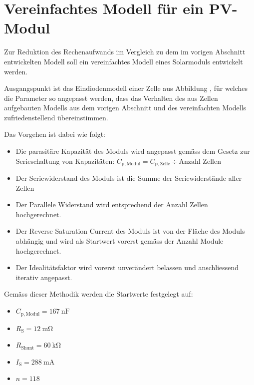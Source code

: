 \chapter{Vereinfachtes Modell f\"ur ein PV-Modul}
\label{app:models:develop:module:simple}

Zur  Reduktion des  Rechenaufwands im  Vergleich zu  dem im  vorigen Abschnitt
entwickelten Modell soll ein vereinfachtes Modell eines Solarmoduls entwickelt
werden.

Ausgangspunkt   ist   das   Eindiodenmodell    einer   Zelle   aus   Abbildung
, f\"ur  welches die Parameter  so angepasst werden,  dass das
Verhalten des aus Zellen aufgebauten Modells aus dem vorigen Abschnitt und des
vereinfachten Modells zufriedenstellend \"ubereinstimmen.

Das Vorgehen ist dabei wie folgt: 

\begin{itemize}
    \firmlist
    \item
        Die parasit\"are  Kapazit\"at des  Moduls wird angepasst  gem\"ass dem
        Gesetz zur Serieschaltung von Kapazit\"aten:
        $C_{\mathrm{p, Modul}} = C_{\mathrm{p, Zelle}} \div \text{Anzahl Zellen}$
    \item
        Der Seriewiderstand des Moduls ist die Summe der Seriewiderst\"ande aller
        Zellen
    \item
        Der  Parallele   Widerstand  wird   entsprechend  der   Anzahl  Zellen
        hochgerechnet.
    \item
        Der Reverse  Saturation Current  des Moduls ist  von der  Fl\"ache des
        Moduls abh\"angig und  wird als Startwert vorerst  gem\"ass der Anzahl
        Module hochgerechnet.
    \item
        Der  Idealit\"atsfaktor   wird  vorerst  unver\"andert   belassen  und
        anschliessend iterativ angepasst.
\end{itemize}

Gem\"ass dieser Methodik werden die Startwerte festgelegt auf:

\begin{itemize}
    \firmlist
    \item
        $C_{\mathrm{p, Modul}} = \SI{167}{\nano\farad}$
    \item
        $R_{\mathrm{S}} = \SI{12}{\milli\ohm}$
    \item
        $R_{\mathrm{Shunt}} = \SI{60}{\kilo\ohm}$
    \item
        $I_{\mathrm{S}} = \SI{288}{\milli\ampere}$
    \item
        $n = 118$
\end{itemize}

